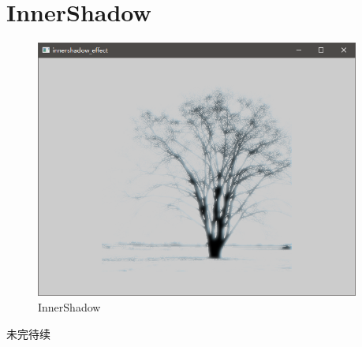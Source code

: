 ﻿




\FloatBarrier
\section{
InnerShadow
}\label{c000015s000015}


\begin{figure}[htb] %
\marginnote{\setlength\fboxsep{2pt}\fbox{\footnotesize{\kaishu\figurename\,}\footnotesize{\ref{p000031}}}}\centering %
\includegraphics[width=0.95\textwidth]{../chapter06/innershadow_effect/the_app.png} %
\caption{InnerShadow} %
\label{p000031} %
\end{figure}


未完待续









